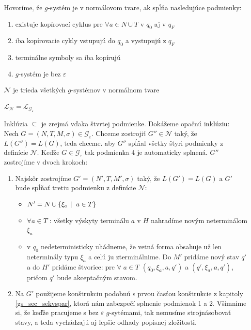 \begin{definicia}
Hovoríme, že $g$-systém je v normálovom tvare, ak spĺňa
nasledujúce podmienky:
\begin{enumerate}
\item existuje kopírovací cyklus pre $\forall a\in N\cup T$ v $q_0$ aj v $q_F$
\item iba kopírovacie cykly vstupujú do $q_0$ a vystupujú z $q_F$
\item terminálne symboly sa iba kopírujú
\item $g$-systém je bez $\varepsilon$
\end{enumerate}
\end{definicia}

\begin{oznacenie}
$\mathcal{N}$ je trieda všetkých $g$-systémov v normálnom tvare
\end{oznacenie}

\begin{veta}
$\mathcal{L}_{\mathcal{N}}=\mathcal{L}_{\mathcal{G}_{\varepsilon}}$
\end{veta}

\begin{dokaz}
Inklúzia $\subseteq$ je zrejmá vďaka štvrtej podmienke. Dokážeme
opačnú inklúziu: \\ Nech
$G=(N,T,M,\sigma)\in\mathcal{G}_\varepsilon$. Chceme zostrojiť
$G''\in\mathcal{N}$ taký, že $L(G'')=L(G)$, teda chceme. aby $G''$
spĺňal všetky štyri podmienky z definície $\mathcal{N}$. Keďže
$G\in\mathcal{G}_\varepsilon$ tak podmienka 4 je automaticky
splnená. $G''$ zostrojíme v dvoch krokoch:
\begin{enumerate}
  \item Najskôr zostrojíme $G'=(N',T,M',\sigma)$ taký, že $L(G')=L(G)$ a $G'$ bude
  spĺňať tretiu podmienku z definície $\mathcal{N}$:
  \begin{itemize}
    \item $N'=N\cup\{\xi_a\enspace |\enspace a\in T\}$
    \item $\forall a\in T$ : všetky výskyty
    terminálu $a$ v $H$ nahradíme novým neterminálom $\xi_a$
    \item v $q_0$ nedeterministicky uhádneme, že vetná forma
    obsahuje už len neterminály typu $\xi_a$ a celú ju
    zterminálnime. Do $M'$ pridáme nový stav $q'$ a do $H'$
    pridáme štvorice: pre $\forall\; a\in T$ $(q_0,\xi_a,a,q')$
    a $(q',\xi_a,a,q')$, pričom $q'$ bude akceptačným stavom.
  \end{itemize}
  \item Na $G'$ použijeme konštrukciu podobnú s prvou časťou
  konštrukcie z kapitoly \ref{gs_sec_sekvspar}, ktorá nám zabezpečí
  splnenie podmienok 1 a 2. Všimnime si, že keďže pracujeme s bez
  $\varepsilon$ $g$-sytémami, tak nemusíme strojnásobovať stavy, a
  teda vychádzajú aj lepšie odhady popisnej zložitosti.
\end{enumerate}
\end{dokaz}

